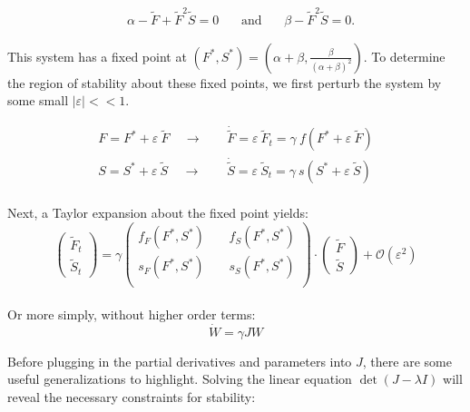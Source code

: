 \documentclass[12pt]{article}
\begin{document}
\begin{align*}
    & \alpha - \tilde{F} + \tilde{F}^2\tilde{S} = 0 ~~~~~~~~ \text{and} ~~~~~~~~\beta - \tilde{F}^2\tilde{S} = 0.
\end{align*}

\noindent This system has a fixed point at $(F^*,S^*)=(\alpha+\beta,\frac{\beta}{(\alpha+\beta)^2})$. To determine the region of stability about these fixed points, we first perturb the system by some small $|\varepsilon|<<1$.

\begin{equation*}
    \begin{aligned}
    F = F^*+\varepsilon~\tilde{F} ~~~~~\longrightarrow~~~~~& \dot{\tilde{F}} = \varepsilon~\tilde{F}_t = \gamma~f(F^*+\varepsilon~\tilde{F})\\
    S = S^*+\varepsilon~\tilde{S} ~~~~~\longrightarrow~~~~~& \dot{\tilde{S}} = \varepsilon~\tilde{S}_t = \gamma~s(S^*+\varepsilon~\tilde{S})
    \end{aligned}
\end{equation*}
\\
\noindent Next, a Taylor expansion about the fixed point yields:
\\
 \begin{equation}
    \left(\begin{aligned}
    \tilde{F}_t \\
    \tilde{S}_t
\end{aligned}\right)
=
\gamma\left(\begin{aligned}
    f_F(F^*,S^*) ~~~~~& f_S(F^*,S^*)\\
    s_F(F^*,S^*) ~~~~~& s_S(F^*,S^*) \\
\end{aligned}\right)
\cdot
\left(\begin{aligned}
    \tilde{F} \\
    \tilde{S}
\end{aligned}\right)
+ \mathcal{O}(\varepsilon^2)
\end{equation}
\\
\noindent Or more simply, without higher order terms:
\begin{equation}
    \label{eq:W_short}
    \dot{W}=\gamma J W
\end{equation}

\noindent Before plugging in the partial derivatives and parameters into $J$, there are some useful generalizations to highlight. Solving the linear equation $\det(J-\lambda I)$ will reveal the necessary constraints for stability:
\end{document}
